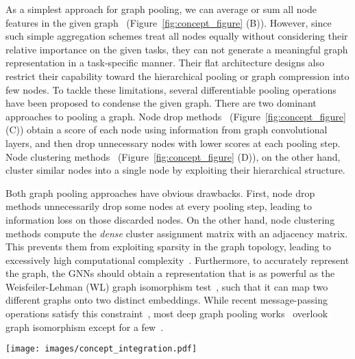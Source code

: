 \documentclass{article} \usepackage{iclr2021_conference,times}
\begin{document}
As a simplest approach for graph pooling, we can average or sum all node features in the given graph~\citep{avg/pooling/1, GIN} (Figure~\ref{fig:concept_figure} (B)). However, since such simple aggregation schemes treat all nodes equally without considering their relative importance on the given tasks, they can not generate a meaningful graph representation in a task-specific manner. Their flat architecture designs also restrict their capability toward the hierarchical pooling or graph compression into few nodes. To tackle these limitations, several differentiable pooling operations have been proposed to condense the given graph. There are two dominant approaches to pooling a graph. Node drop methods~\citep{SortPool, SAGPool} (Figure~\ref{fig:concept_figure} (C)) obtain a score of each node using information from graph convolutional layers, and then drop unnecessary nodes with lower scores at each pooling step. Node clustering methods~\citep{DiffPool, MincutPool} (Figure~\ref{fig:concept_figure} (D)), on the other hand, cluster similar nodes into a single node by exploiting their hierarchical structure.

Both graph pooling approaches have obvious drawbacks. First, node drop methods unnecessarily drop some nodes at every pooling step, leading to information loss on those discarded nodes. On the other hand, node clustering methods compute the \emph{dense} cluster assignment matrix with an adjacency matrix. This prevents them from exploiting sparsity in the graph topology, leading to excessively high computational complexity~\citep{SAGPool}. Furthermore, to accurately represent the graph, the GNNs should obtain a representation that is as powerful as the Weisfeiler-Lehman (WL) graph isomorphism test~\citep{WLtest}, such that it can map two different graphs onto two distinct embeddings. While recent message-passing operations satisfy this constraint~\citep{WL/GNN, GIN}, most deep graph pooling works~\citep{DiffPool, SAGPool, TopKPool, MincutPool} overlook graph isomorphism except for a few~\citep{SortPool}.

\begin{figure*}[t]
    \centering
    \texttt{[image: images/concept\_integration.pdf]}
    \vskip -0.125in
    \caption{\small \textbf{Concepts (Left):} Conceptual comparison of graph pooling methods. Grey box indicates the readout layer, which is compatible with our method. Also, green check icon indicates the model that can be as powerful as the WL test. \textbf{(Right):} An illustration of set, multiset, and graph multiset encoding for graph representation.}
    \vskip -0.15in
    \label{fig:concept_figure}
\end{figure*}
\end{document}
